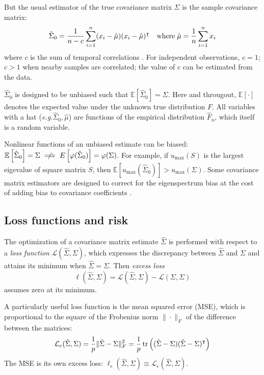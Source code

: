 But the usual estimator of the true covariance matrix $\Sigma$ is  the sample covariance matrix:
\begin{equation}
\hat\Sigma_0 =  \frac 1 {n-c} \sum\limits_{i=1}^n (x_i -\hat\mu) (x_i - \hat\mu)^\intercal
\quad\mbox{where}\;
\hat\mu = \frac 1 n \sum\limits_{i=1}^n x_i
\end{equation}
where $c$ is the sum of temporal correlations . For independent observations, $c=1$;  $c>1$ when nearby samples are correlated; the value of $c$ can be estimated from the data.

$\hat\Sigma_0$ is designed to be unbiased such that $\mathbb E\left[\hat\Sigma_0\right]=\Sigma$.
Here and througout, $\mathbb E[\cdot]$ denotes the expected value under the  unknown true distribution $F$. All variables with a hat (\emph{e.g.}\;$\hat \Sigma_0,\hat \mu$) are functions of the empirical distribution $\hat F_n$, which itself is a random variable.

Nonlinear functions of an unbiased estimate can be biased: $\mathbb E\left[\hat\Sigma_0\right]=\Sigma \centernot\implies  E\left[\varphi(\hat\Sigma_0)\right]=\varphi(\Sigma)$.  For example, if $u_{\max}(S)$ is the largest eigevalue of square matrix $S$, then $\mathbb E\left[u_{\max}(\hat\Sigma_0)\right] > u_{\max}(\Sigma)$. Some covariance matrix estimators are designed to correct for the eigenspectrum bias at the cost of adding bias to covariance coefficients \citep{Ledoit:2004}.




\subsection{Loss functions and risk}
The optimization of a covariance matrix estimate $\hat\Sigma$ is performed with respect to a \emph{loss function} $\mathcal L(\hat\Sigma,\Sigma)$, which expresses the discrepancy between $\hat\Sigma$ and $\Sigma$ and attains its minimum when $\hat\Sigma=\Sigma$.  
Then \emph{excess loss}  
\begin{equation}
\ell(\hat\Sigma,\Sigma) = \mathcal L(\hat\Sigma,\Sigma)-\mathcal L(\Sigma,\Sigma)
\end{equation}
assumes zero at its minimum.

A particularly useful loss function is the mean squared error (MSE), which is proportional to the square of the Frobenius  norm $\|\cdot\|_F$ of the difference between the matrices: 
\begin{equation}
\mathcal L_e(\hat\Sigma,\Sigma) =\frac 1 p \|\hat\Sigma-\Sigma\|_F^2 = \frac 1 p \operatorname{tr}\left((\hat \Sigma-\Sigma)(\hat\Sigma-\Sigma)^\intercal\right)
\end{equation}
The MSE is its own excess loss: $\ell_e(\hat\Sigma,\Sigma) \equiv \mathcal L_e(\hat\Sigma,\Sigma)$.

